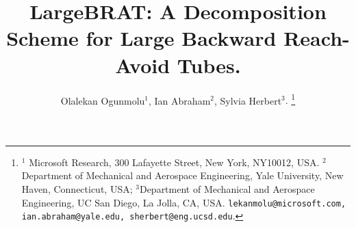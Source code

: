 \documentclass[letterpaper, 10 pt, journal, twoside]{IEEEtran}
\begin{document}

\title{LargeBRAT: A Decomposition Scheme for Large Backward  Reach-Avoid Tubes. 
}

\author{Olalekan Ogunmolu$^1$, Ian Abraham$^2$, Sylvia Herbert$^3.$  
	\thanks{\footnotesize $^{1}$ Microsoft Research, 300 Lafayette Street, New York, NY10012, USA. $^{2}$Department of Mechanical and Aerospace Engineering, Yale University, New Haven, Connecticut, USA; $^{3}$Department of Mechanical and Aerospace Engineering, UC San Diego, La Jolla, CA, USA.  {\tt\small lekanmolu@microsoft.com, ian.abraham@yale.edu, sherbert@eng.ucsd.edu}. }
}

\maketitle









\appendix
\begin{appendices}
%	
	
%	
%	
\end{appendices}

%


	 	
%
\end{document}
